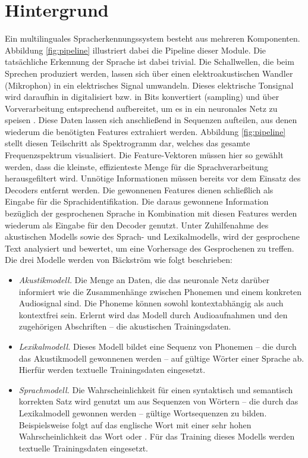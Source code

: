 \section{Hintergrund}
Ein multilinguales Spracherkennungssystem besteht aus mehreren Komponenten. Abbildung \ref{fig:pipeline} illustriert dabei die Pipeline dieser Module. Die tatsächliche Erkennung der Sprache ist dabei trivial. Die Schallwellen, die beim Sprechen produziert werden, lassen sich über einen elektroakustischen Wandler (Mikrophon) in ein elektrisches Signal umwandeln. Dieses elektrische Tonsignal wird daraufhin in digitalisiert bzw. in Bits konvertiert (sampling) und über Vorverarbeitung entsprechend aufbereitet, um es in ein neuronales Netz zu speisen {\cite{beat_tobias}}. Diese Daten lassen sich anschließend in Sequenzen aufteilen, aus denen wiederum die benötigten Features extrahiert werden. Abbildung \ref{fig:pipeline} stellt diesen Teilschritt als Spektrogramm dar, welches das gesamte Frequenzspektrum visualisiert. Die Feature-Vektoren müssen hier so gewählt werden, dass die kleinste, effizienteste Menge für die Sprachverarbeitung herausgefiltert wird. Unnötige Informationen müssen bereits vor dem Einsatz des Decoders entfernt werden. Die gewonnenen Features dienen schließlich als Eingabe für die Sprachidentifikation. Die daraus gewonnene Information bezüglich der gesprochenen Sprache in Kombination mit diesen Features werden wiederum als Eingabe für den Decoder genutzt. Unter Zuhilfenahme des akustischen Modells sowie des Sprach- und Lexikalmodells, wird der gesprochene Text analysiert und bewertet, um eine Vorhersage des Gesprochenen zu treffen.
Die drei Modelle werden von Bäckström \cite{Tom.2016} wie folgt beschrieben:

\begin{itemize}
    \item \textit{Akustikmodell.} Die Menge an Daten, die das neuronale Netz darüber informiert wie die Zusammenhänge zwischen Phonemen und einem konkreten Audiosignal sind. Die Phoneme können
    sowohl kontextabhängig als auch kontextfrei sein.
    Erlernt wird das Modell durch Audioaufnahmen und den zugehörigen Abschriften – die akustischen Trainingsdaten.
    \item \textit{Lexikalmodell.} Dieses Modell bildet eine Sequenz von Phonemen – die durch das Akustikmodell gewonnenen werden – auf gültige Wörter einer Sprache ab. Hierfür werden textuelle Trainingsdaten eingesetzt.
    \item \textit{Sprachmodell.} Die Wahrscheinlichkeit für einen syntaktisch und semantisch korrekten Satz wird genutzt um aus Sequenzen von Wörtern – die durch das Lexikalmodell gewonnen werden – gültige Wortsequenzen zu bilden.
    Beispielsweise folgt auf das englische Wort \grqq{} mit einer sehr hohen Wahrscheinlichkeit das Wort \grqq{} oder
    \grqq{}. Für das Training dieses Modells werden textuelle Trainingsdaten eingesetzt.
\end{itemize}

